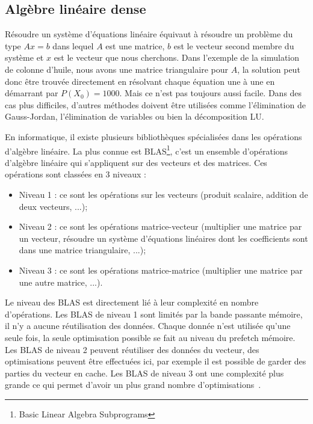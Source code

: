 \subsection{Algèbre linéaire dense}
Résoudre un système d'équations linéaire équivaut à résoudre un problème du type $Ax=b$ dans lequel $A$ est une matrice, $b$ est le vecteur second membre du système et $x$ est le vecteur que nous cherchons.
%
Dans l'exemple de la simulation de colonne d'huile, nous avons une matrice triangulaire pour $A$, la solution peut donc être trouvée directement en résolvant chaque équation une à une en démarrant par $P(X_0) = 1000$.
%
Mais ce n'est pas toujours aussi facile.
%
Dans des cas plus difficiles, d'autres méthodes doivent être utilisées comme l'élimination de Gauss-Jordan, l'élimination de variables ou bien la décomposition LU.


En informatique, il existe plusieurs bibliothèques spécialisées dans les opérations d'algèbre linéaire.
%
La plus connue est BLAS\footnote{Basic Linear Algebra Subprograms}, c'est un ensemble d'opérations d'algèbre linéaire qui s'appliquent sur des vecteurs et des matrices.
%
Ces opérations sont classées en 3 niveaux :
\begin{itemize}
  \item Niveau 1 : ce sont les opérations sur les vecteurs (produit scalaire, addition de deux vecteurs, ...);
  \item Niveau 2 : ce sont les opérations matrice-vecteur (multiplier une matrice par un vecteur, résoudre un système d'équations linéaires dont les coefficients sont dans une matrice triangulaire, ...);
  \item Niveau 3 : ce sont les opérations matrice-matrice (multiplier une matrice par une autre matrice, ...).
\end{itemize}
%
Le niveau des BLAS est directement lié à leur complexité en nombre d'opérations.
%
Les BLAS de niveau 1 sont limités par la bande passante mémoire, il n'y a aucune réutilisation des données.
%
Chaque donnée n'est utilisée qu'une seule fois, la seule optimisation possible se fait au niveau du prefetch mémoire.
%
Les BLAS de niveau 2 peuvent réutiliser des données du vecteur, des optimisations peuvent être effectuées ici, par exemple il est possible de garder des parties du vecteur en cache.
%
Les BLAS de niveau 3 ont une complexité plus grande ce qui permet d'avoir un plus grand nombre d'optimisations~\cite{blas3_opt}.

